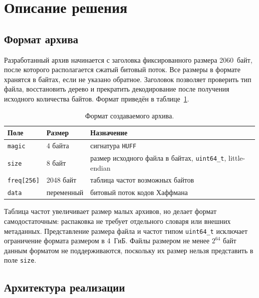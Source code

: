 
\section{Описание решения}
\label{sec:solution}

\subsection{Формат архива}

Разработанный архив начинается с заголовка фиксированного размера 2060~байт,
после которого располагается сжатый битовый поток. Все размеры в формате
хранятся в байтах, если не указано обратное. Заголовок позволяет
проверить тип файла, восстановить дерево и прекратить декодирование после
получения исходного количества байтов. Формат приведён в
таблице~\ref{tab:archive-format}.

\begin{table}[htbp]
    \centering
    \caption{Формат создаваемого архива.}
    \label{tab:archive-format}
    \begin{tabularx}{\textwidth}{@{}l l >{\raggedright\arraybackslash}X@{}}
        \toprule
        Поле & Размер & Назначение \\
        \midrule
        \texttt{magic} & 4 байта & сигнатура \texttt{HUFF} \\
        \texttt{size} & 8 байт & размер исходного файла в байтах, \texttt{uint64\_t}, little-endian \\
        \texttt{freq[256]} & 2048 байт & таблица частот возможных байтов \\
        \texttt{data} & переменный & битовый поток кодов Хаффмана \\
        \bottomrule
    \end{tabularx}
\end{table}

Таблица частот увеличивает размер малых архивов, но делает формат
самодостаточным: распаковка не требует отдельного словаря или внешних
метаданных. Представление размера файла и частот типом \texttt{uint64\_t}
исключает ограничение формата размером в 4~ГиБ. Файлы размером не менее
$2^{64}$ байт данным форматом не поддерживаются, поскольку их размер нельзя
представить в поле \texttt{size}.

\subsection{Архитектура реализации}

